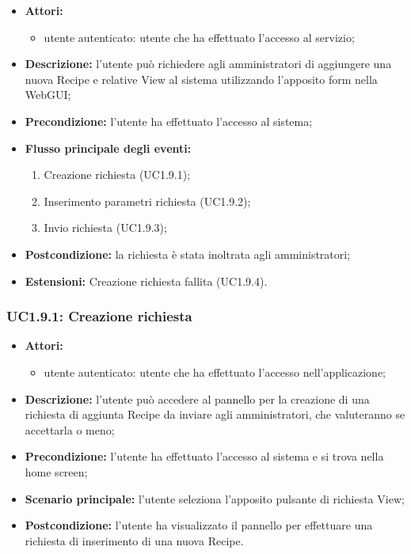 \begin{itemize}
	\item \textbf{Attori:}
	\begin{itemize}
		\item utente autenticato: utente che ha effettuato l'accesso al servizio;
	\end{itemize}
	\item \textbf{Descrizione:} l'utente può richiedere agli amministratori di aggiungere una nuova Recipe e relative View al sistema utilizzando l'apposito form nella WebGUI;
	\item \textbf{Precondizione:} l'utente ha effettuato l'accesso al sistema;
	\item \textbf{Flusso principale degli eventi:}
	\begin{enumerate}
		\item Creazione richiesta (UC1.9.1);
		\item Inserimento parametri richiesta (UC1.9.2);
		\item Invio richiesta (UC1.9.3);
	\end{enumerate}
	\item \textbf{Postcondizione:} la richiesta è stata inoltrata agli amministratori;
	\item \textbf{Estensioni:} Creazione richiesta fallita (UC1.9.4).
\end{itemize}

\subsubsection{UC1.9.1: Creazione richiesta}
\begin{itemize}
	\item \textbf{Attori:}
	\begin{itemize}
		\item utente autenticato: utente che ha effettuato l'accesso nell'applicazione;
	\end{itemize}
	\item \textbf{Descrizione:} l'utente può accedere al pannello per la creazione di una richiesta di aggiunta Recipe da inviare agli amministratori, che valuteranno se accettarla o meno;
	\item \textbf{Precondizione:} l'utente ha effettuato l'accesso al sistema e si trova nella home screen;
	\item \textbf{Scenario principale:} l'utente seleziona l'apposito pulsante di richiesta View;
	\item \textbf{Postcondizione:} l'utente ha visualizzato il pannello per effettuare una richiesta di inserimento di una nuova Recipe.
\end{itemize}

